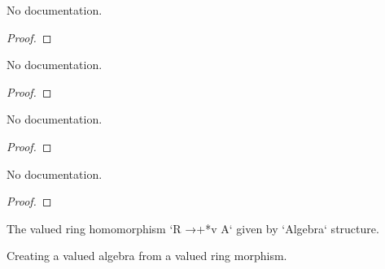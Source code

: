 \begin{definition}
\begin{theorem}\label{ValAlgEquiv.symm_trans_self}
        \leanok
                No documentation.
    \end{theorem}

\begin{proof}
    \leanok
\end{proof}

\begin{theorem}\label{ValAlgEquiv.self_symm_trans}
        \leanok
                No documentation.
    \end{theorem}

\begin{proof}
    \leanok
\end{proof}

\begin{theorem}\label{ValAlgEquiv.one_apply}
        \leanok
                No documentation.
    \end{theorem}

\begin{proof}
    \leanok
\end{proof}

\begin{theorem}\label{ValAlgEquiv.mul_apply}
        \leanok
                No documentation.
    \end{theorem}

\begin{proof}
    \leanok
\end{proof}

\begin{definition}\label{valAlgebraMap}
        \leanok
                The valued ring homomorphism `R →+*v A` given by `Algebra` structure.
    \end{definition}

\begin{definition}\label{ValRingHom.toValAlgebra'}
        \leanok
                Creating a valued algebra from a valued ring morphism.
    \end{definition}


\end{definition}
